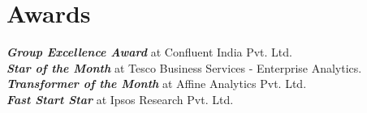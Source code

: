 \section{Awards}
  \begin{itemize}[leftmargin=0.1in, label={}]
    \normalsize{
      \item{
        \textit{\textbf{Group Excellence Award}} at Confluent India Pvt. Ltd. \\
        \textit{\textbf{Star of the Month}} at Tesco Business Services - Enterprise Analytics. \\
        \textit{\textbf{Transformer of the Month}} at Affine Analytics Pvt. Ltd. \\
        \textit{\textbf{Fast Start Star}} at Ipsos Research Pvt. Ltd.
      }
    }
  \end{itemize}
